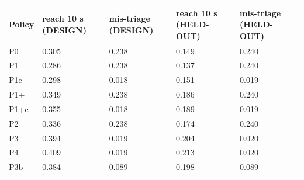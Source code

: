 \begin{tabular}{lllll}
\hline
Policy & reach 10 s (DESIGN) & mis-triage (DESIGN) & reach 10 s (HELD-OUT) & mis-triage (HELD-OUT) \\
\hline
P0 & 0.305 & 0.238 & 0.149 & 0.240 \\
P1 & 0.286 & 0.238 & 0.137 & 0.240 \\
P1e & 0.298 & 0.018 & 0.151 & 0.019 \\
P1+ & 0.349 & 0.238 & 0.186 & 0.240 \\
P1+e & 0.355 & 0.018 & 0.189 & 0.019 \\
P2 & 0.336 & 0.238 & 0.174 & 0.240 \\
P3 & 0.394 & 0.019 & 0.204 & 0.020 \\
P4 & 0.409 & 0.019 & 0.213 & 0.020 \\
P3b & 0.384 & 0.089 & 0.198 & 0.089 \\
\hline
\end{tabular}
